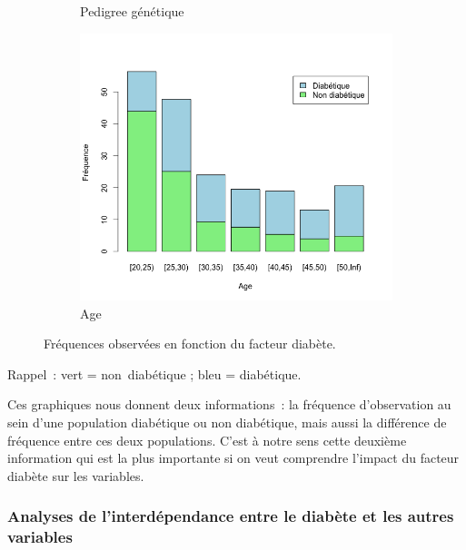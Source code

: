 \documentclass[a4paper,11pt]{report}
\begin{document}
\begin{figure}[H]
\begin{subfigure}[b]{0.25\linewidth}
		\caption{\scriptsize Pedigree génétique}
		\label{fig:1-3-2-barplot-freq-diabete-pedigree}
	\end{subfigure}%
	\begin{subfigure}[b]{0.25\linewidth}
		\centering
		\captionsetup{justification=centering}
		\includegraphics[width=1\linewidth]{img/1-3-2-barplot-freq-diabete-age}
		\caption{\scriptsize Age}
		\label{fig:1-3-2-barplot-freq-diabete-age}
	\end{subfigure}%
	\caption{
		\small Fréquences observées en fonction du facteur diabète.
	}
	\label{fig:bar_plot_freq_diabete_pima}%
\end{figure}


Rappel~: vert = non\ diabétique ; bleu = diabétique.

Ces graphiques nous donnent deux informations~: la fréquence d'observation au sein d'une population diabétique ou non diabétique, mais aussi la différence de fréquence entre ces deux populations. C'est à notre sens cette deuxième information qui est la plus importante si on veut comprendre l'impact du facteur diabète sur les variables.

\subsubsection{Analyses de l'interdépendance entre le diabète et les autres variables}
\end{document}
